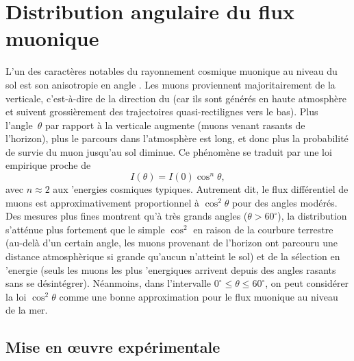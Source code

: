 \documentclass[a4paper,12pt,twoside]{article}
\begin{document}
\section{Distribution angulaire du flux muonique}
L'un des caract\`eres notables du rayonnement cosmique muonique au niveau du sol est son anisotropie en angle . Les muons proviennent majoritairement de la verticale, c'est-\`a-dire de la direction du  (car ils sont g\'en\'er\'es en haute atmosph\`ere et suivent grossi\`erement des trajectoires quasi-rectilignes vers le bas). Plus l'angle~$\theta$ par rapport \`a la verticale augmente (muons venant rasants de l'horizon), plus le parcours dans l'atmosph\`ere est long, et donc plus la probabilit\'e de survie du muon jusqu'au sol diminue. Ce ph\'enom\`ene se traduit par une loi empirique proche de
\[
  I(\theta) = I(0)\cos^n\theta,
\]
avec $n \approx 2$ aux 'energies cosmiques typiques. Autrement dit, le flux diff\'erentiel de muons est approximativement proportionnel \`a $\cos^2\theta$ pour des angles mod\'er\'es. Des mesures plus fines montrent qu'\`a tr\`es grands angles ($\theta > 60^\circ$), la distribution s'att\'enue plus fortement que le simple $\cos^2$ en raison de la courbure terrestre (au-del\`a d'un certain angle, les muons provenant de l'horizon ont parcouru une distance atmosph\`erique si grande qu'aucun n'atteint le sol) et de la s\'election en 'energie (seuls les muons les plus 'energiques arrivent depuis des angles rasants sans se d\'esint\'egrer). N\'eanmoins, dans l'intervalle $0^\circ \le \theta \leq 60^\circ$, on peut consid\'erer la loi $\cos^2\theta$ comme une bonne approximation pour le flux muonique au niveau de la mer.

\subsection{Mise en œuvre expérimentale}
\end{document}

